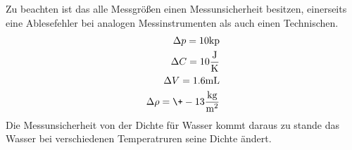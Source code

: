 Zu beachten ist das alle Messgrößen einen Messunsicherheit besitzen, einerseits eine Ablesefehler bei analogen Messinstrumenten als auch einen Technischen.
\begin{eqnarray*}
  \Delta p = 10 \text{kp}				\\
  \Delta C = 10 \frac{\text{J}}{\text{K}}		\\
  \Delta V = 1.6 \text{mL}				\\
  \Delta \rho = \+- 13 \frac{\text{kg}}{\text{m$^2$}}	\\
\end{eqnarray*}
Die Messunsicherheit von der Dichte für Wasser kommt daraus zu stande das Wasser bei verschiedenen Temperatruren seine Dichte ändert. 
